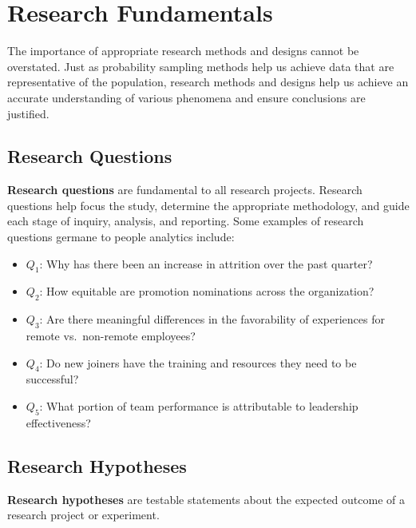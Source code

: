 \documentclass[
]{book}
\providecommand{\tightlist}{%
  \setlength{\itemsep}{0pt}\setlength{\parskip}{0pt}}
\begin{document}
\hypertarget{research}{%
\chapter{Research Fundamentals}\label{research}}

The importance of appropriate research methods and designs cannot be overstated. Just as probability sampling methods help us achieve data that are representative of the population, research methods and designs help us achieve an accurate understanding of various phenomena and ensure conclusions are justified.

\hypertarget{research-questions}{%
\section{Research Questions}\label{research-questions}}

\textbf{Research questions} are fundamental to all research projects. Research questions help focus the study, determine the appropriate methodology, and guide each stage of inquiry, analysis, and reporting. Some examples of research questions germane to people analytics include:

\begin{itemize}
\tightlist
\item
  \(Q_1\): Why has there been an increase in attrition over the past quarter?
\item
  \(Q_2\): How equitable are promotion nominations across the organization?
\item
  \(Q_3\): Are there meaningful differences in the favorability of experiences for remote vs.~non-remote employees?
\item
  \(Q_4\): Do new joiners have the training and resources they need to be successful?
\item
  \(Q_5\): What portion of team performance is attributable to leadership effectiveness?
\end{itemize}

\hypertarget{research-hypotheses}{%
\section{Research Hypotheses}\label{research-hypotheses}}

\textbf{Research hypotheses} are testable statements about the expected outcome of a research project or experiment.
\end{document}
